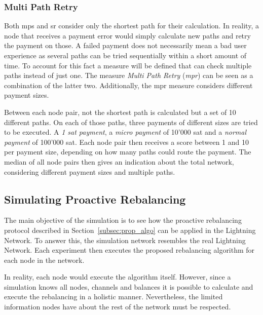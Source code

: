 \documentclass[final]{fhnwreport}       %
\begin{document}
\subsubsection{Multi Path Retry}
Both \gls{mps} and \gls{sr} consider only the shortest path for their calculation. In reality, a node that receives a payment error would simply calculate new paths and retry the payment on those. A failed payment does not necessarily mean a bad user experience as several paths can be tried sequentially within a short amount of time. To account for this fact a measure will be defined that can check multiple paths instead of just one. The measure \emph{Multi Path Retry} (\emph{\gls{mpr}}) can be seen as a combination of the latter two. Additionally, the \gls{mpr} measure considers different payment sizes.

Between each node pair, not the shortest path is calculated but a set of 10 different paths. On each of those paths, three payments of different sizes are tried to be executed. A \emph{1 sat payment}, a \emph{micro payment} of 10'000 sat and a \emph{normal payment} of 100'000 sat. Each node pair then receives a score between 1 and 10 per payment size, depending on how many paths could route the payment. The median of all node pairs then gives an indication about the total network, considering different payment sizes and multiple paths.


\subsection{Simulating Proactive Rebalancing}\label{subsec:pro}
The main objective of the simulation is to see how the proactive rebalancing protocol described in Section~\ref{subsec:prop_algo} can be applied in the Lightning Network. To answer this, the simulation network resembles the real Lightning Network. Each experiment then executes the proposed rebalancing algorithm for each node in the network.

In reality, each node would execute the algorithm itself. However, since a simulation knows all nodes, channels and balances it is possible to calculate and execute the rebalancing in a holistic manner. Nevertheless, the limited information nodes have about the rest of the network must be respected. 
\end{document}

